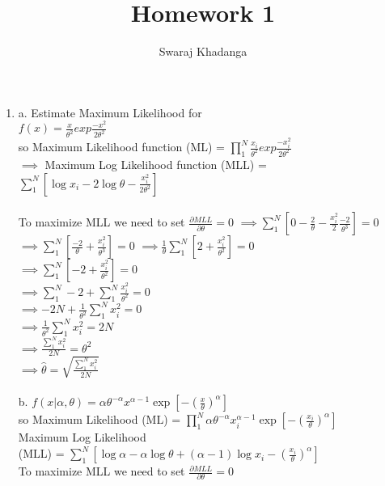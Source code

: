 \documentclass[]{report}
\title{Homework 1}
\author{Swaraj Khadanga}
\begin{document}
\maketitle

\begin{enumerate}
	\item a. Estimate Maximum Likelihood for \\
	$f(x)=\frac{x}{\theta^2}exp{\frac{-x^2}{2\theta^2}}$\\
	so Maximum Likelihood function (ML) = $\prod_{1}^{N}\frac{x_{i}}{\theta^2}exp{\frac{-x_{i}^2}{2\theta^2}}$ \\
	$\implies$ Maximum Log Likelihood function (MLL) = \\
	 $\sum_{1}^{N}[\log x_{i}-2\log \theta-\frac{x_{i}^2}{2\theta^2}]$ \\ \\
	To maximize MLL we need to set $\frac{\partial MLL}{\partial \theta} = 0$
	$\implies \sum_{1}^{N}[0-\frac{2}{\theta}-\frac{x_{i}^2}{2} \frac{-2}{\theta^3}] = 0$ \\
	$\implies \sum_{1}^{N}[\frac{-2}{\theta}+\frac{x_{i}^2}{\theta^3}] = 0$	
	$\implies \frac{1}{\theta}\sum_{1}^{N}[2+\frac{x_{i}^2}{\theta^2}] = 0$	\\
	$\implies \sum_{1}^{N}[-2+\frac{x_{i}^2}{\theta^2}] = 0$		\\
	$\implies \sum_{1}^{N}-2+ \sum_{1}^{N}\frac{x_{i}^2}{\theta^2} = 0$		\\
	$\implies -2N+ \frac{1}{\theta^2}\sum_{1}^{N}x_{i}^2 = 0$		\\
	$\implies \frac{1}{\theta^2}\sum_{1}^{N}x_{i}^2 = 2N$		\\
	$\implies \frac{\sum_{1}^{N}x_{i}^2}{2N} = \theta^2$		\\	
	$\implies \hat{\theta} = \sqrt{\frac{\sum_{1}^{N}x_{i}^2}{2N}}$		\\	
	\\
	b. $f(x|\alpha,\theta) = \alpha \theta^{-\alpha} x^{\alpha-1} \exp [-(\frac{x}{\theta})^{\alpha}]$\\
	so Maximum Likelihood (ML) = $\prod_{1}^{N} \alpha \theta^{-\alpha} x_{i}^{\alpha-1} \exp [-(\frac{x_{i}}{\theta})^{\alpha}]$\\
	Maximum Log Likelihood \\
	(MLL) = $\sum_{1}^{N} [\log \alpha - \alpha \log \theta + (\alpha-1)\log x_{i} - (\frac{x_{i}}{\theta})^{\alpha}]$\\
	To maximize MLL we need to set $\frac{\partial MLL}{\partial \theta} = 0$\\

\end{enumerate}
\end{document}
